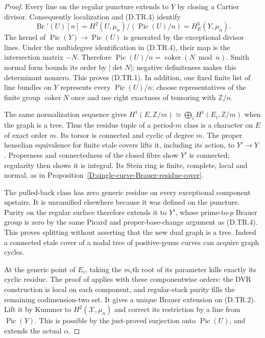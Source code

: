 \begin{proof}
Every line on the regular puncture extends to $Y$ by
closing a Cartier divisor. Consequently localization
and (D.TR.4) identify
\[
 \operatorname{Br}'(U)[n]
 =H^2(U,\mu_n)/(\operatorname{Pic}(U)/n)
                         =H^3_E(Y,\mu_n).              \tag{D.TR.6}
\]
The kernel of $\operatorname{Pic}(Y)\to\operatorname{Pic}(U)$
is generated by the exceptional divisor lines. Under the
multidegree identification in (D.TR.4), their map is the
intersection matrix $-N$. Therefore
$\operatorname{Pic}(U)/n=\operatorname{coker}(N\bmod n)$.
Smith normal form bounds its order by $|\det N|$;
negative definiteness makes this determinant nonzero.
This proves (D.TR.1). In addition, one fixed finite list
of line bundles on $Y$ represents every
$\operatorname{Pic}(U)/n$: choose representatives of
the finite group $\operatorname{coker}N$ once and use
right exactness of tensoring with $\mathbb Z/n$.

The same normalization sequence gives
$H^1(E,\mathbb Z/m)\simeq\bigoplus_iH^1(E_i,\mathbb Z/m)$
when the graph is a tree. Thus the residue tuple of a
period-$m$ class is a character on $E$ of exact order
$m$. Its torsor is connected and cyclic of degree $m$.
The proper henselian equivalence for finite etale covers
lifts it, including its action, to $Y'\to Y$
\citep[Lemma58.9.1, Tag0A48]{StacksSingleCurveBrauerD}.
Properness and connectedness of the closed fibre show
$Y'$ is connected; regularity then shows it is integral.
Its Stein ring is finite, complete, local and normal,
as in Proposition~\ref{D:single-curve-Brauer-residue-cover}.

The pulled-back class has zero generic residue on every
exceptional component upstairs. It is unramified elsewhere
because it was defined on the puncture. Purity on the
regular surface therefore extends it to $Y'$, whose
prime-to-$p$ Brauer group is zero by the same Picard and
proper-base-change argument as (D.TR.4). This proves
splitting without asserting that the new dual graph is
a tree. Indeed a connected etale cover of a nodal tree
of positive-genus curves can acquire graph cycles.

At the generic point of $E_i$, taking the $m_i$th root
of its parameter kills exactly its cyclic residue.
The proof of \citet[Proposition3.2.1, complete pp10--11]
{Lieblich2011ResidualD} applies with these componentwise
orders: the DVR construction is local on each component,
and regular-stack purity fills the remaining codimension-two
set. It gives a unique Brauer extension on (D.TR.2).
Lift it by Kummer to $H^2(\mathcal X,\mu_n)$ and correct
its restriction by a line from $\operatorname{Pic}(Y)$.
This is possible by the just-proved surjection onto
$\operatorname{Pic}(U)$, and extends the actual $\alpha$.


\end{proof}

